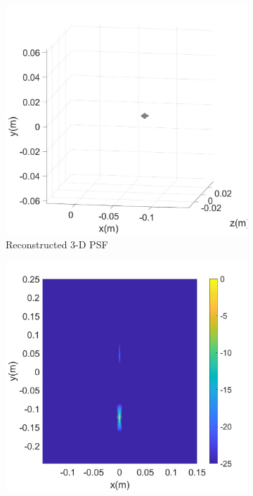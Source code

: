 \documentclass[conference]{IEEEtran}
\begin{document}
\begin{figure} [h]
\begin{subfigure}{.5\linewidth}
				\includegraphics[width=1\linewidth]{../MatlabResults/CSAR_PSF_output}
				\caption{Reconstructed 3-D PSF}
			\end{subfigure}
			\begin{subfigure}{.5\linewidth}
				\label{fig:psf_xy}
				\centering
				\includegraphics[width=1\linewidth]{../MatlabResults/CSAR_PSFxy}

\end{subfigure}
\end{figure}
\end{document}
